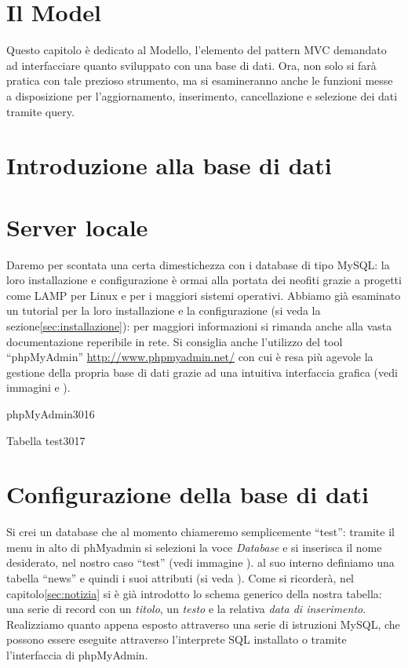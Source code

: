 \section{Il Model}
\label{cap:model}

Questo capitolo è dedicato al Modello, l'elemento del pattern \ac{MVC} demandato ad interfacciare quanto sviluppato con una base di dati. Ora, non solo si farà pratica con tale prezioso strumento, ma si esamineranno anche le funzioni messe a disposizione per l'aggiornamento, inserimento, cancellazione e selezione dei dati tramite query.

\section*{Introduzione alla base di dati}
\omissis

\section*{Server locale}
Daremo per scontata una certa dimestichezza con i database di tipo MySQL: la loro installazione e configurazione è ormai alla portata dei neofiti grazie a progetti come LAMP per Linux e per i maggiori sistemi operativi. Abbiamo già esaminato un tutorial per la loro installazione e la configurazione (si veda la sezione\vref{sec:installazione}): per maggiori informazioni si rimanda anche alla vasta documentazione reperibile in rete. Si consiglia anche l'utilizzo del tool ``phpMyAdmin'' \url{http://www.phpmyadmin.net/} con cui è resa più agevole la gestione della propria base di dati grazie ad una intuitiva interfaccia grafica (vedi immagini  e ).

\begin{img}{phpMyAdmin}{3}{016}
\end{img}

\begin{img}{Tabella test}{3}{017}
\end{img}

\section*{Configurazione della base di dati}
Si crei un database che al momento chiameremo semplicemente ``test'': tramite il menu in alto di phMyadmin si selezioni la voce \textit{Database} e si inserisca il nome desiderato, nel nostro caso ``test'' (vedi immagine ).
al suo interno definiamo una tabella ``news'' e quindi i suoi attributi (si veda ). Come si ricorderà, nel capitolo\vref{sec:notizia} si è già introdotto lo schema generico della nostra tabella: una serie di record con un \emph{titolo}, un \emph{testo} e la relativa \emph{data di inserimento}. Realizziamo quanto appena esposto attraverso una serie di istruzioni MySQL, che possono essere eseguite attraverso l'interprete SQL installato o tramite l'interfaccia di phpMyAdmin.

